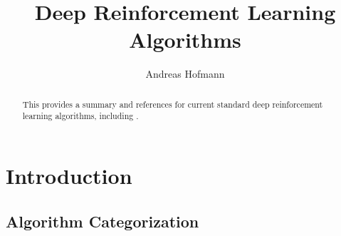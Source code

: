 \documentclass[acmlarge,screen]{acmart}
\begin{document}
%
\title{Deep Reinforcement Learning Algorithms}

%
\author{Andreas Hofmann}

%
\renewcommand{\shortauthors}{Hofmann}

%
\begin{abstract}
This provides a summary and references for current standard deep reinforcement learning algorithms, including .
\end{abstract}


%

%
\maketitle

\section{Introduction}

\subsection{Algorithm Categorization}
\end{document}
